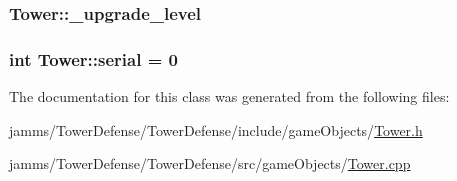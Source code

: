 \hypertarget{class_tower_a0172731487da6a0480901e031e2aecbe}{
\subsubsection[{\+\_\+upgrade\+\_\+level}]{ Tower\+::\+\_\+upgrade\+\_\+level\hspace{0.3cm}{\ttfamily [protected]}}}\label{class_tower_a0172731487da6a0480901e031e2aecbe}
\hypertarget{class_tower_a53001ebc47ba7e60fdb7eb1dcdd82a64}{
\subsubsection[{serial}]{\setlength{\rightskip}{0pt plus 5cm}int Tower\+::serial = 0\hspace{0.3cm}{\ttfamily [static]}}}\label{class_tower_a53001ebc47ba7e60fdb7eb1dcdd82a64}


The documentation for this class was generated from the following files\+:\begin{DoxyCompactItemize}
\item 
jamms/\+Tower\+Defense/\+Tower\+Defense/include/game\+Objects/\hyperlink{_tower_8h}{Tower.\+h}\item 
jamms/\+Tower\+Defense/\+Tower\+Defense/src/game\+Objects/\hyperlink{_tower_8cpp}{Tower.\+cpp}\end{DoxyCompactItemize}
